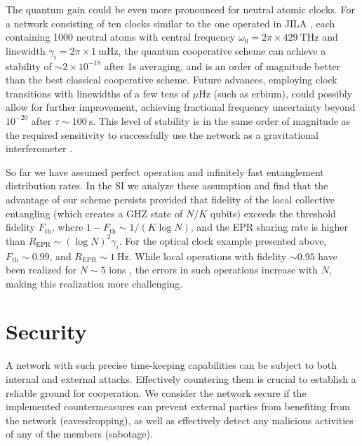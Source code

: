 The quantum gain could be even more pronounced for neutral atomic clocks. For a
network consisting of ten clocks similar to the one operated in JILA
\cite{Bloom2014}, each containing 1000 neutral atoms with central frequency
$\omega_0 = 2\pi\times 429~\mathrm{THz}$ and linewidth $\gamma_i = 2\pi \times
1~\mathrm{mHz}$,  the quantum cooperative scheme can achieve a stability of $\sim
2\times 10^{-18}$ after 1s averaging, and is an order of magnitude
better than the best classical cooperative scheme.  Future advances,
employing clock transitions with linewidths of a few tens of
$\mu\mathrm{Hz}$ (such as erbium), could possibly allow for further
improvement, achieving fractional frequency uncertainty beyond $10^{-20}$
after $\tau \sim 100~\mathrm{s}$. This level of stability is in the same order of
magnitude as the required sensitivity to successfully use the network as a
gravitational interferometer \cite{Schiller2008}.


So far we have assumed perfect operation and infinitely fast entanglement
distribution rates. In the SI we analyze these assumption and find that the
advantage of our scheme persists provided that fidelity  of the local collective
entangling \cite{MSgate} (which creates a GHZ state of $N/K$ qubits) exceeds the
threshold fidelity $F_\mathrm{th}$, where $1-F_\mathrm{th} \sim 1/(K\log N)$, and
the EPR sharing rate is higher than $R_\mathrm{EPR}\sim (\log N)^2 \gamma_i$.
For the optical clock example presented above, $F_\mathrm{th} \sim 0.99$, and
$R_\mathrm{EPR} \sim 1~\mathrm{Hz}$. While local operations with fidelity
$\sim 0.95$ have been realized for $N\sim 5$ ions \cite{Monz2011}, the errors
in such operations increase with $N$, making this realization more challenging.




\section{Security}
\label{sec:Security}
A network with such precise time-keeping capabilities can be subject to both internal
and external attacks. Effectively countering them is crucial to establish a
reliable ground for cooperation. We consider the network secure if the
implemented countermeasures can prevent external parties from benefiting from
the network (eavesdropping), as well as effectively detect any malicious activities of any of the members (sabotage).

